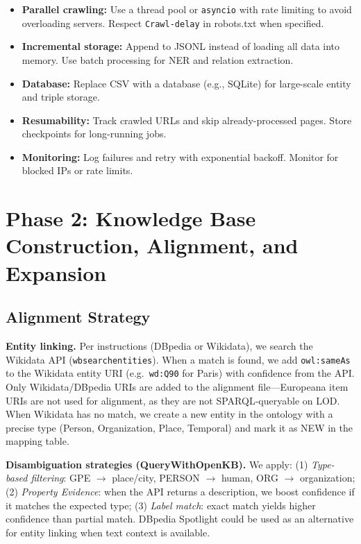 \documentclass[11pt,a4paper]{article}
\begin{document}
  \begin{itemize}
  \item \textbf{Parallel crawling:} Use a thread pool or \texttt{asyncio} with rate limiting to avoid overloading servers. Respect \texttt{Crawl-delay} in robots.txt when specified.

  \item \textbf{Incremental storage:} Append to JSONL instead of loading all data into memory. Use batch processing for NER and relation extraction.

  \item \textbf{Database:} Replace CSV with a database (e.g., SQLite) for large-scale entity and triple storage.

  \item \textbf{Resumability:} Track crawled URLs and skip already-processed pages. Store checkpoints for long-running jobs.

  \item \textbf{Monitoring:} Log failures and retry with exponential backoff. Monitor for blocked IPs or rate limits.
  \end{itemize}

  \section{Phase 2: Knowledge Base Construction, Alignment, and Expansion}

  \subsection{Alignment Strategy}

  \textbf{Entity linking.} Per instructions (DBpedia or Wikidata), we search the Wikidata API (\texttt{wbsearchentities}). When a match is found, we add \texttt{owl:sameAs} to the Wikidata entity URI (e.g.\ \texttt{wd:Q90} for Paris) with confidence from the API. Only Wikidata/DBpedia URIs are added to the alignment file---Europeana item URIs are not used for alignment, as they are not SPARQL-queryable on LOD. When Wikidata has no match, we create a new entity in the ontology with a precise type (Person, Organization, Place, Temporal) and mark it as NEW in the mapping table.

  \textbf{Disambiguation strategies (QueryWithOpenKB).} We apply: (1) \textit{Type-based filtering}: GPE $\rightarrow$ place/city, PERSON $\rightarrow$ human, ORG $\rightarrow$ organization; (2) \textit{Property Evidence}: when the API returns a description, we boost confidence if it matches the expected type; (3) \textit{Label match}: exact match yields higher confidence than partial match. DBpedia Spotlight could be used as an alternative for entity linking when text context is available.
\end{document}
